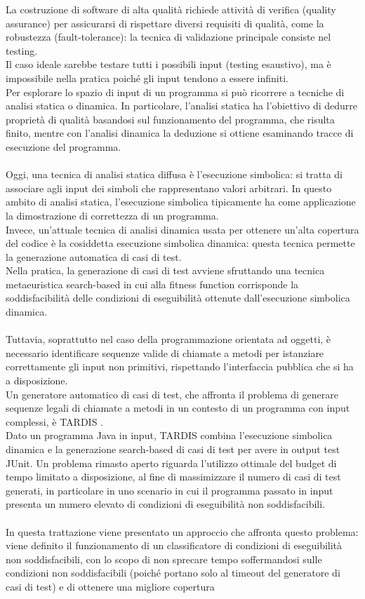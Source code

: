 \documentclass[a4paper, 12pt, oneside]{book}
\theoremstyle{normal}
\begin{document}
La costruzione di software di alta qualità richiede attività di verifica (quality assurance) per assicurarsi di rispettare diversi requisiti di qualità, come la robustezza (fault-tolerance): la tecnica di validazione principale consiste nel testing. \\ Il caso ideale sarebbe testare tutti i possibili input (testing esaustivo), ma è impossibile nella pratica poiché gli input tendono a essere infiniti. \\ Per esplorare lo spazio di input di un programma si può ricorrere a tecniche di analisi statica o dinamica. In particolare, l'analisi statica ha l'obiettivo di dedurre proprietà di qualità basandosi sul funzionamento del programma, che risulta finito, mentre con l'analisi dinamica la deduzione si ottiene esaminando tracce di esecuzione del programma. \\ \\ Oggi, una tecnica di analisi statica diffusa è l'esecuzione simbolica: si tratta di associare agli input dei simboli che rappresentano valori arbitrari. In questo ambito di analisi statica, l'esecuzione simbolica tipicamente ha come applicazione la dimostrazione di correttezza di un programma. \\ Invece, un'attuale tecnica di analisi dinamica usata per ottenere un'alta copertura del codice è la cosiddetta esecuzione simbolica dinamica: questa tecnica permette la generazione automatica di casi di test. \\ Nella pratica, la generazione di casi di test avviene sfruttando una tecnica metaeuristica search-based in cui alla fitness function corrisponde la soddisfacibilità delle condizioni di eseguibilità ottenute dall'esecuzione simbolica dinamica. \\ \\ Tuttavia, soprattutto nel caso della programmazione orientata ad oggetti, è necessario identificare sequenze valide di chiamate a metodi per istanziare correttamente gli input non primitivi, rispettando l'interfaccia pubblica che si ha a disposizione. \\ Un generatore automatico di casi di test, che affronta il problema di generare sequenze legali di chiamate a metodi in un contesto di un programma con input complessi, è TARDIS \cite{braione2019sushi}. \\ Dato un programma Java in input, TARDIS combina l'esecuzione simbolica dinamica e la generazione search-based di casi di test per avere in output test JUnit. Un problema rimasto aperto riguarda l'utilizzo ottimale del budget di tempo limitato a disposizione, al fine di massimizzare il numero di casi di test generati, in particolare in uno scenario in cui il programma passato in input presenta un numero elevato di condizioni di eseguibilità non soddisfacibili. \\ \\ In questa trattazione viene presentato un approccio che affronta questo problema: viene definito il funzionamento di un classificatore di condizioni di eseguibilità non soddisfacibili, con lo scopo di non sprecare tempo soffermandosi sulle condizioni non soddisfacibili (poiché portano solo al timeout del generatore di casi di test) e di ottenere una migliore copertura 
\end{document}
